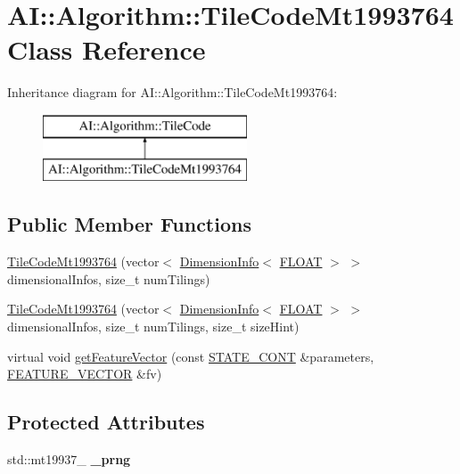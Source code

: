 \hypertarget{classAI_1_1Algorithm_1_1TileCodeMt1993764}{\section{A\-I\-:\-:Algorithm\-:\-:Tile\-Code\-Mt1993764 Class Reference}
\label{classAI_1_1Algorithm_1_1TileCodeMt1993764}
}
Inheritance diagram for A\-I\-:\-:Algorithm\-:\-:Tile\-Code\-Mt1993764\-:\begin{figure}[H]
\begin{center}
\leavevmode
\includegraphics[height=2.000000cm]{classAI_1_1Algorithm_1_1TileCodeMt1993764}
\end{center}
\end{figure}
\subsection*{Public Member Functions}
\begin{DoxyCompactItemize}
\item 
\hyperlink{classAI_1_1Algorithm_1_1TileCodeMt1993764_a0d8eee3e74ccf5587d1f376e9c54a33f}{Tile\-Code\-Mt1993764} (vector$<$ \hyperlink{classAI_1_1Algorithm_1_1DimensionInfo}{Dimension\-Info}$<$ \hyperlink{namespaceAI_a41b74884a20833db653dded3918e05c3}{F\-L\-O\-A\-T} $>$ $>$ dimensional\-Infos, size\-\_\-t num\-Tilings)
\item 
\hyperlink{classAI_1_1Algorithm_1_1TileCodeMt1993764_a6062251f25cab695518db0fda5f97dc6}{Tile\-Code\-Mt1993764} (vector$<$ \hyperlink{classAI_1_1Algorithm_1_1DimensionInfo}{Dimension\-Info}$<$ \hyperlink{namespaceAI_a41b74884a20833db653dded3918e05c3}{F\-L\-O\-A\-T} $>$ $>$ dimensional\-Infos, size\-\_\-t num\-Tilings, size\-\_\-t size\-Hint)
\item 
virtual void \hyperlink{classAI_1_1Algorithm_1_1TileCodeMt1993764_a8d3e8fd183947d9dcb19e63139ea0871}{get\-Feature\-Vector} (const \hyperlink{namespaceAI_aff63ec21d97dd5f086fddbc3103f5707}{S\-T\-A\-T\-E\-\_\-\-C\-O\-N\-T} \&parameters, \hyperlink{namespaceAI_a23a39e1b301a5c1345fa508796940631}{F\-E\-A\-T\-U\-R\-E\-\_\-\-V\-E\-C\-T\-O\-R} \&fv)
\end{DoxyCompactItemize}
\subsection*{Protected Attributes}
\begin{DoxyCompactItemize}
\item 
\hypertarget{classAI_1_1Algorithm_1_1TileCodeMt1993764_a2b2f796c8f67e2076c1149c9d5e43be9}{std\-::mt19937\-\_ {\bfseries \-\_\-prng}}\label{classAI_1_1Algorithm_1_1TileCodeMt1993764_a2b2f796c8f67e2076c1149c9d5e43be9}

\end{DoxyCompactItemize}
